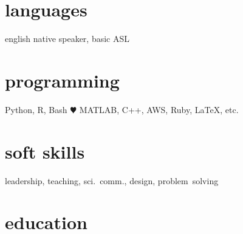\documentclass[]{friggeri-cv} %
\begin{document}
\begin{aside}
\section{languages}
english native speaker,
basic ASL
\section{programming}
Python, R, Bash {\color{red} $\varheartsuit$}
MATLAB, C++, AWS,
Ruby, LaTeX, etc.
\section{soft skills}
leadership, teaching, sci.~comm., design, problem~solving
\end{aside}


\section{education}
\end{document}
